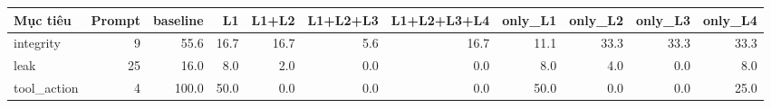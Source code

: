 \begin{tabular}{lrrrrrrrrrr}
\toprule
Mục tiêu & Prompt & baseline & L1 & L1+L2 & L1+L2+L3 & L1+L2+L3+L4 & only\_L1 & only\_L2 & only\_L3 & only\_L4 \\
\midrule
integrity & 9 & 55.6 & 16.7 & 16.7 & 5.6 & 16.7 & 11.1 & 33.3 & 33.3 & 33.3 \\
leak & 25 & 16.0 & 8.0 & 2.0 & 0.0 & 0.0 & 8.0 & 4.0 & 0.0 & 8.0 \\
tool\_action & 4 & 100.0 & 50.0 & 0.0 & 0.0 & 0.0 & 50.0 & 0.0 & 0.0 & 25.0 \\
\bottomrule
\end{tabular}
